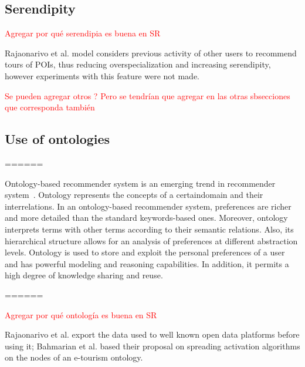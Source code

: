 



\subsection{Serendipity}

\textcolor{red}{Agregar por qué serendipia es buena en SR}

Rajaonarivo et al. \cite{rajaonarivo2019rec} model considers previous activity of other users to recommend tours of POIs, thus reducing overspecialization and increasing serendipity, however experiments with this feature were not made.

\textcolor{red}{Se pueden agregar otros ? Pero se tendrían que agregar en las otras sbsecciones que corresponda también}

\subsection{Use of ontologies}

======

Ontology-based  recommender  system  is  an  emerging  trend  in recommender   system~\cite{borras2014intelligent,yochum2020linked}.   Ontology represents   the   concepts   of   a certaindomain   and   their interrelations. In   an   ontology-based   recommender   system, preferences  are  richer  and  more  detailed  than  the  standard keywords-based ones. Moreover, ontology interprets terms with other  terms  according  to  their  semantic  relations.  Also,  its hierarchical  structure  allows  for  an  analysis  of  preferences  at different abstraction levels. Ontology is used to store and exploit the personal preferences of a user and has powerful modeling and reasoning  capabilities.  In  addition,  it  permits  a  high  degree  of knowledge sharing and reuse.


======


\textcolor{red}{Agregar por qué ontología es buena en SR}


Rajaonarivo et al. \cite{rajaonarivo2019rec} export the data used to well known open data platforms before using it; Bahmarian et al. \cite{bahramian_abbaspour_claramunt_2017} based their proposal on spreading activation algorithms on the nodes of an e-tourism ontology.

